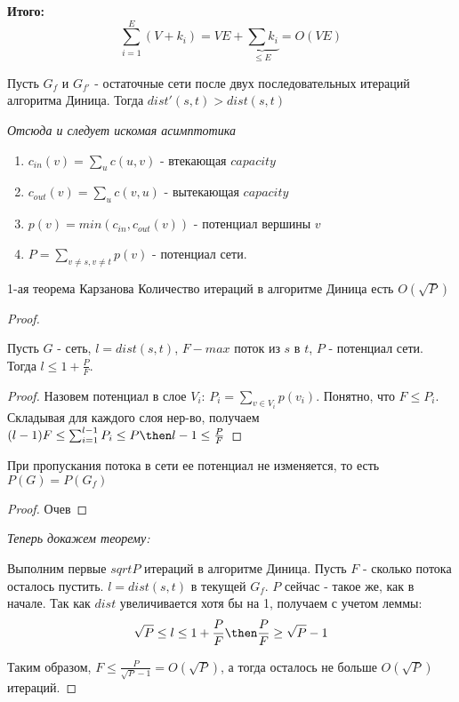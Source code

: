   \textbf{Итого:}
  $$\sum^E_{i = 1} (V + k_i) = VE + \underbrace{\sum k_i}_{\leq E} = O(VE)$$
  \begin{proposition}
    Пусть $G_f$ и $G_{f'}$ - остаточные сети после двух последовательных итераций алгоритма Диница. Тогда $dist'(s, t) > dist(s, t)$
  \end{proposition}
  \textit{Отсюда и следует искомая асимптотика}
  \begin{definition}
    \text{}

    \begin{enumerate}
      \item $c_{in}(v) = \sum_{u} c(u, v)$ - втекающая $capacity$
       \item $c_{out}(v) = \sum_{u} c(v, u)$ - вытекающая $capacity$
        \item $p(v) = min(c_{in}, c_{out}(v))$ - потенциал вершины $v$
        \item $P = \sum_{v \ne s, v \ne t} p(v)$ - потенциал сети.
    \end{enumerate}
  \end{definition}
  \begin{theorem}{1-ая теорема Карзанова}
    Количество итераций в алгоритме Диница есть $O(\sqrt{P})$
  \end{theorem}
  \begin{proof}
    \begin{lemma}
      Пусть $G$ - сеть, $l = dist(s, t)$, $F - max$ поток из $s$ в $t$, $P$ - потенциал сети. Тогда $l \le 1 + \frac{P}{F}$.
    \end{lemma}
    \begin{proof}
      Назовем потенциал в слое $V_i$: $P_i = \sum_{v \in V_i} p(v_i)$. Понятно, что $F \le P_i$.
      Складывая для каждого слоя нер-во, получаем $(l - 1) F \le \sum_{i = 1}^{l - 1} P_i \le P \then l - 1 \le \frac{P}{F}$
    \end{proof}

    \begin{lemma}
      При пропускания потока в сети ее потенциал не изменяется, то есть $P(G) = P(G_f)$
    \end{lemma}
    \begin{proof}
      Очев
    \end{proof}

    \textit{Теперь докажем теорему:}

    Выполним первые $sqrt{P}$ итераций в алгоритме Диница. Пусть $F$ - сколько потока осталось пустить. $l = dist(s, t)$ в текущей $G_f$. $P$ сейчас - такое же, как в начале. Так как $dist$ увеличивается хотя бы на 1, получаем с учетом леммы: $$\sqrt{P} \le l \le 1 + \frac{P}{F} \then \frac{P}{F} \ge \sqrt{P} - 1$$

    Таким образом, $F \le \frac{P}{\sqrt{P} - 1} = O(\sqrt{P})$, а тогда осталось не больше $O(\sqrt{P})$ итераций.
  \end{proof}


